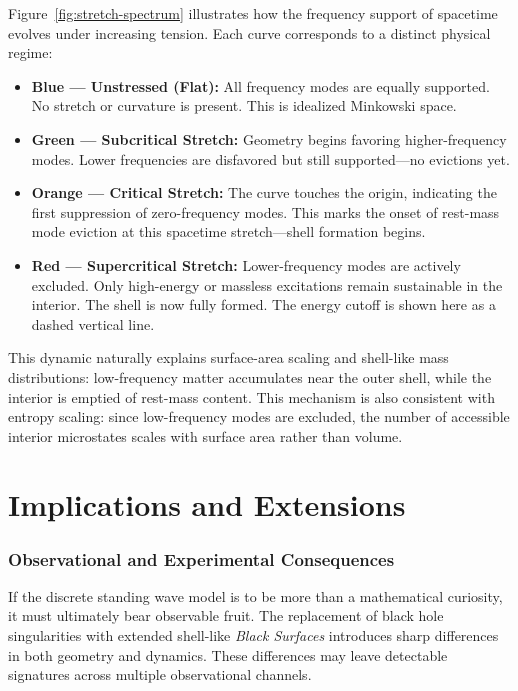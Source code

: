 \documentclass[12pt]{article}
\begin{document}
\newpage
Figure~\ref{fig:stretch-spectrum} illustrates how the frequency support of spacetime evolves under increasing tension. Each curve corresponds to a distinct physical regime:
\begin{itemize}
\item \textbf{Blue --- Unstressed (Flat):} All frequency modes are equally supported. No stretch or curvature is present. This is idealized Minkowski space.

\item \textbf{Green --- Subcritical Stretch:} Geometry begins favoring higher-frequency modes. Lower frequencies are disfavored but still supported---no evictions yet.

\item \textbf{Orange --- Critical Stretch:} The curve touches the origin, indicating the first suppression of zero-frequency modes. This marks the onset of rest-mass mode eviction at this spacetime stretch---shell formation begins.

\item \textbf{Red --- Supercritical Stretch:} Lower-frequency modes are actively excluded. Only high-energy or massless excitations remain sustainable in the interior. The shell is now fully formed.  The energy cutoff is shown here as a dashed vertical line.
\end{itemize}

This dynamic naturally explains surface-area scaling and shell-like mass distributions: low-frequency matter accumulates near the outer shell, while the interior is emptied of rest-mass content.  This mechanism is also consistent with entropy scaling: since low-frequency modes are excluded, the number of accessible interior microstates scales with surface area rather than volume.


\cleardoublepage
\part{Implications and Extensions}

\section{Observational and Experimental Consequences}

If the discrete standing wave model is to be more than a mathematical curiosity, it must ultimately bear observable fruit. The replacement of black hole singularities with extended shell-like \emph{Black Surfaces} introduces sharp differences in both geometry and dynamics. These differences may leave detectable signatures across multiple observational channels.
\end{document}
